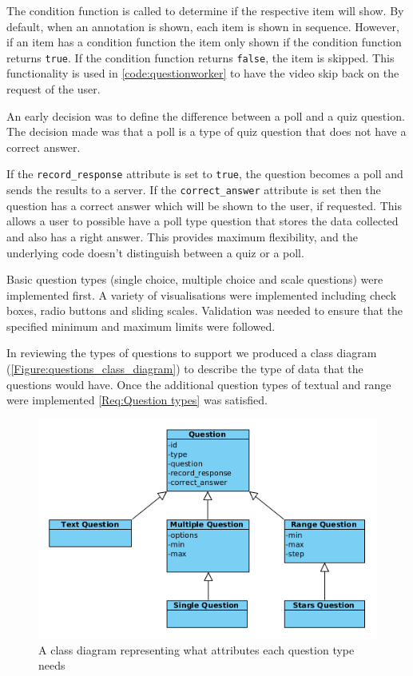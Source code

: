 The condition function is called to determine if the respective item will show. By default, when an \gls{annotation} is shown, each item is shown in sequence. However, if an item has a condition function the item only shown if the condition function returns \lstinline|true|. If the condition function returns \lstinline|false|, the item is skipped. This functionality is used in \autoref{code:questionworker} to have the video skip back on the request of the user.

An early decision was to define the difference between a poll and a quiz question. The decision made was that a poll is a type of quiz question that does not have a correct answer.

If the \lstinline|record_response| attribute is set to \lstinline|true|, the question becomes a poll and sends the results to a server. If the \lstinline|correct_answer| attribute is set then the question has a correct answer which will be shown to the user, if requested. This allows a user to possible have a poll type question that stores the data collected and also has a right answer. This provides maximum flexibility, and the underlying code doesn't distinguish between a quiz or a poll.

Basic question types (single choice, multiple choice and scale questions) were implemented first. A variety of visualisations were implemented including check boxes, radio buttons and sliding scales. Validation was needed to ensure that the specified minimum and maximum limits were followed.

In reviewing the types of questions to support we produced a class diagram (\autoref{Figure:questions_class_diagram}) to describe the type of data that the questions would have. Once the additional question types of textual and range were implemented \cref{Req:Question types} was satisfied.

\begin{figure}
	\centering
	\includegraphics[width=12cm]{../figures/questions_class_diagram.png}
	\caption{A class diagram representing what attributes each question type needs}
	\label{Figure:questions_class_diagram}
\end{figure}

